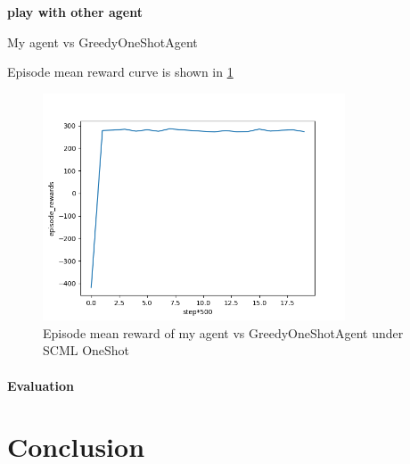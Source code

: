 \textbf{play with other agent}

My agent vs GreedyOneShotAgent

Episode mean reward curve is shown in \ref{fig:oneshot-my-vs-greedy}

\begin{figure}[htbp]
\centering
\includegraphics[width=0.80\textwidth]{./images/oneshot_my_vs_greedy.png}
\caption{Episode mean reward of my agent vs GreedyOneShotAgent under SCML OneShot}
\label{fig:oneshot-my-vs-greedy}
\end{figure}

\paragraph{Evaluation}


\section{Conclusion}